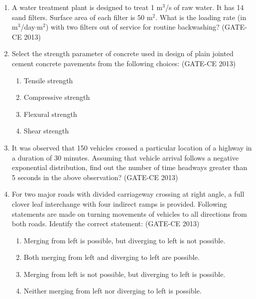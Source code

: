 \documentclass[journal,12pt,onecolumn]{article}
\theoremstyle{remark}
\begin{document}
\begin{enumerate}
    \item A water treatment plant is designed to treat 1 m$^3$/s of raw water. It has 14 sand filters. Surface area of each filter is 50 m$^2$. What is the loading rate (in m$^3$/day$\cdot$m$^2$) with two filters out of service for routine backwashing? \underline{\hspace{3cm}} (GATE-CE 2013)
    
    \item Select the strength parameter of concrete used in design of plain jointed cement concrete pavements from the following choices: (GATE-CE 2013)
    \begin{multicols}{2}
    \begin{enumerate}
        \item Tensile strength 
        \item Compressive strength 
        \item Flexural strength 
        \item Shear strength
    \end{enumerate}
    \end{multicols}
    
    \item It was observed that 150 vehicles crossed a particular location of a highway in a duration of 30 minutes. Assuming that vehicle arrival follows a negative exponential distribution, find out the number of time headways greater than 5 seconds in the above observation? \underline{\hspace{3cm}} (GATE-CE 2013)
    
    \item For two major roads with divided carriageway crossing at right angle, a full clover leaf interchange with four indirect ramps is provided. Following statements are made on turning movements of vehicles to all directions from both roads. Identify the correct statement: (GATE-CE 2013)
    \begin{enumerate}
        \item Merging from left is possible, but diverging to left is not possible. 
        \item Both merging from left and diverging to left are possible. 
        \item Merging from left is not possible, but diverging to left is possible. 
        \item Neither merging from left nor diverging to left is possible.
    \end{enumerate}
    

\end{enumerate}
\end{document}

